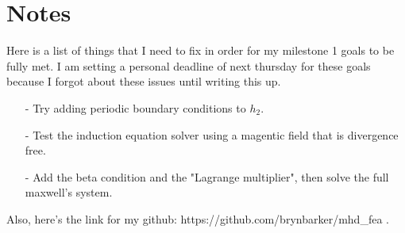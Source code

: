 \documentclass{article}
\begin{document}
\section*{Notes}
Here is a list of things that I need to fix in order for my milestone 1 goals to be fully met. I am setting a personal deadline of next thursday for these goals because I forgot about these issues until writing this up. 
\begin{itemize}
    \item[-] Try adding periodic boundary conditions to $h_2$.
    \item[-] Test the induction equation solver using a magentic field that is divergence free.
    \item[-] Add the beta condition and the "Lagrange multiplier", then solve the full maxwell's system.
\end{itemize}

\noindent Also, here's the link for my github: https://github.com/brynbarker/mhd\_fea .
\end{document}
